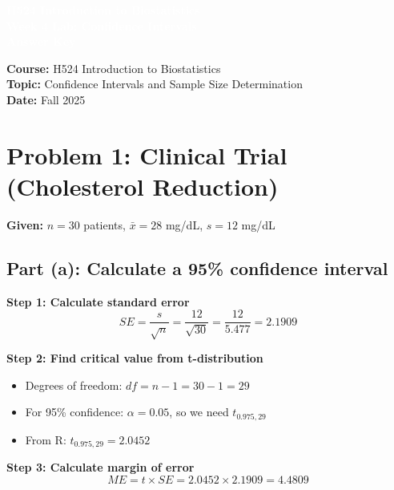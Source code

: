 \documentclass[11pt]{article}
\title{}
\author{}
\date{}
\begin{document}
\begin{tcolorbox}[colback=osaorange,colframe=black,boxrule=2pt,arc=0pt,left=3pt,right=3pt,top=6pt,bottom=6pt,boxsep=2pt]
\centering
\textcolor{white}{\textbf{\Large H524 Introduction to Biostatistics}}\\
\textcolor{white}{\textbf{\Large Week 4 Lab: Confidence Intervals}}\\
\textcolor{white}{\textbf{\Large Answer Key}}
\end{tcolorbox}

\vspace{12pt}

\noindent\textbf{Course:} H524 Introduction to Biostatistics\\
\textbf{Topic:} Confidence Intervals and Sample Size Determination\\
\textbf{Date:} Fall 2025

\vspace{12pt}

\noindent{}

\section*{Problem 1: Clinical Trial (Cholesterol Reduction)}

\textbf{Given:} $n = 30$ patients, $\bar{x} = 28$ mg/dL, $s = 12$ mg/dL

\subsection*{Part (a): Calculate a 95\% confidence interval}

\textbf{Step 1: Calculate standard error}
$$SE = \frac{s}{\sqrt{n}} = \frac{12}{\sqrt{30}} = \frac{12}{5.477} = 2.1909$$

\textbf{Step 2: Find critical value from t-distribution}
\begin{itemize}
\item Degrees of freedom: $df = n - 1 = 30 - 1 = 29$
\item For 95\% confidence: $\alpha = 0.05$, so we need $t_{0.975, 29}$
\item From R: $t_{0.975, 29} = 2.0452$
\end{itemize}

\textbf{Step 3: Calculate margin of error}
$$ME = t \times SE = 2.0452 \times 2.1909 = 4.4809$$
\end{document}
